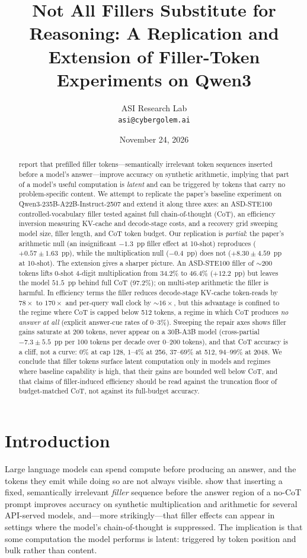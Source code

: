 \documentclass[11pt,a4paper]{article}
\title{Not All Fillers Substitute for Reasoning: A Replication and Extension of
Filler-Token Experiments on Qwen3}
\author{ASI Research Lab\\
        \texttt{asi@cybergolem.ai}}
\date{November 24, 2026}
\begin{document}
\maketitle

\begin{abstract}
\citet{baherwani2026not} report that prefilled filler tokens---semantically
irrelevant token sequences inserted before a model's answer---improve accuracy on
synthetic arithmetic, implying that part of a model's useful computation is
\emph{latent} and can be triggered by tokens that carry no problem-specific
content. We attempt to replicate the paper's baseline experiment on
Qwen3-235B-A22B-Instruct-2507 and extend it along three axes: an
ASD-STE100 controlled-vocabulary filler tested against full
chain-of-thought (CoT), an efficiency inversion measuring KV-cache and
decode-stage costs, and a recovery grid sweeping model size, filler length, and
CoT token budget. Our replication is \emph{partial}: the paper's arithmetic null
(an insignificant $-1.3$~pp filler effect at 10-shot) reproduces
($+0.57 \pm 1.63$~pp), while the multiplication null ($-0.4$~pp) does not
($+8.30 \pm 4.59$~pp at 10-shot). The extension gives a sharper picture. An
ASD-STE100 filler of ${\sim}200$ tokens lifts 0-shot 4-digit multiplication from
34.2\% to 46.4\% ($+12.2$~pp) but leaves the model $51.5$~pp behind full CoT
(97.2\%); on multi-step arithmetic the filler is harmful. In efficiency terms
the filler reduces decode-stage KV-cache token-reads by $78\times$ to $170\times$
and per-query wall clock by ${\sim}16\times$, but this advantage is confined to
the regime where CoT is capped below 512 tokens, a regime in which CoT produces
\emph{no answer at all} (explicit answer-cue rates of 0--3\%). Sweeping the
repair axes shows filler gains saturate at 200 tokens, never appear on a 30B-A3B
model (cross-partial $-7.3 \pm 5.5$~pp per 100 tokens per decade over 0--200
tokens), and that CoT accuracy is a cliff, not a curve: $0\%$ at cap 128,
$1$--$4\%$ at 256, $37$--$69\%$ at 512, $94$--$99\%$ at 2048. We conclude that
filler tokens surface latent computation only in models and regimes where
baseline capability is high, that their gains are bounded well below CoT, and
that claims of filler-induced efficiency should be read against the truncation
floor of budget-matched CoT, not against its full-budget accuracy.
\end{abstract}

\section{Introduction}
Large language models can spend compute before producing an answer, and the
tokens they emit while doing so are not always visible. \citet{baherwani2026not}
show that inserting a fixed, semantically irrelevant \emph{filler} sequence
before the answer region of a no-CoT prompt improves accuracy on synthetic
multiplication and arithmetic for several API-served models, and---more
strikingly---that filler effects can appear in settings where the model's
chain-of-thought is suppressed. The implication is that some computation the
model performs is latent: triggered by token position and bulk rather than
content.
\end{document}
